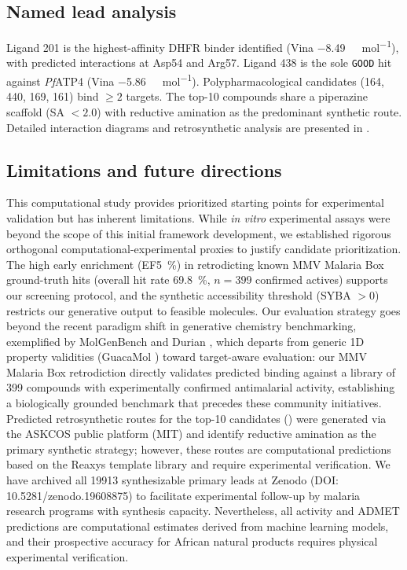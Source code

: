 \documentclass[journal=jcisd8,manuscript=article]{achemso}
\begin{document}
\subsection*{Named lead analysis}
\label{sec:discussion-leads}

Ligand 201 is the highest-affinity DHFR binder identified (Vina \qty{-8.49}{\kilo\calorie\per\mole}), with predicted interactions at Asp54 and Arg57. Ligand 438 is the sole \texttt{GOOD} hit against \emph{Pf}ATP4 (Vina \qty{-5.86}{\kilo\calorie\per\mole}). Polypharmacological candidates (164, 440, 169, 161) bind $\geq 2$ targets. The top-10 compounds share a piperazine scaffold (SA $< \num{2.0}$) with reductive amination as the predominant synthetic route. Detailed interaction diagrams and retrosynthetic analysis are presented in .

\subsection*{Limitations and future directions}

This computational study provides prioritized starting points for experimental validation but has inherent limitations. While \textit{in vitro} experimental assays were beyond the scope of this initial framework development, we established rigorous orthogonal computational-experimental proxies to justify candidate prioritization. The high early enrichment (EF\qty{5}{\percent}) in retrodicting known MMV Malaria Box ground-truth hits (overall hit rate \qty{69.8}{\percent}, $n = \num{399}$ confirmed actives) supports our screening protocol, and the synthetic accessibility threshold (SYBA $> \num{0}$) restricts our generative output to feasible molecules. Our evaluation strategy goes beyond the recent paradigm shift in generative chemistry benchmarking, exemplified by MolGenBench \cite{Cao2025molgenbench} and Durian \cite{Nie2024durian}, which departs from generic 1D property validities (GuacaMol \cite{Brown2019}) toward target-aware evaluation: our MMV Malaria Box retrodiction directly validates predicted binding against a library of \num{399} compounds with experimentally confirmed antimalarial activity, establishing a biologically grounded benchmark that precedes these community initiatives. Predicted retrosynthetic routes for the top-10 candidates () were generated via the ASKCOS public platform (MIT) and identify reductive amination as the primary synthetic strategy; however, these routes are computational predictions based on the Reaxys template library and require experimental verification. We have archived all \num{19913} synthesizable primary leads at Zenodo (DOI: 10.5281/zenodo.19608875) to facilitate experimental follow-up by malaria research programs with synthesis capacity. Nevertheless, all activity and ADMET predictions are computational estimates derived from machine learning models, and their prospective accuracy for African natural products requires physical experimental verification.
\end{document}
